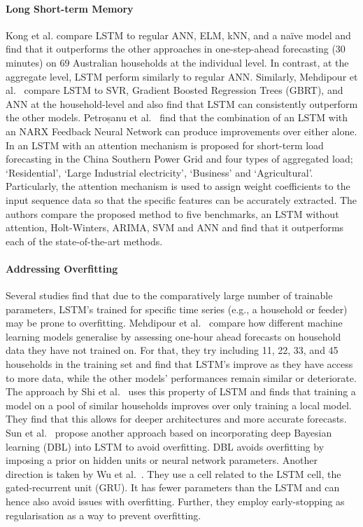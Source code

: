 \paragraph{Long Short-term Memory} Kong et al.\cite{kong2017str} compare LSTM to regular ANN, ELM, kNN, and a na{\"i}ve model and find that it outperforms the other approaches in one-step-ahead forecasting (30 minutes) on 69 Australian households at the individual level. In contrast, at the aggregate level, LSTM perform similarly to regular ANN. Similarly, Mehdipour et al.~\cite{mehdipour2020slf} compare LSTM to SVR, Gradient Boosted Regression Trees (GBRT), and ANN at the household-level and also find that LSTM can consistently outperform the other models. Petroșanu et al.~\cite{petrosanu2019ddv} find that the combination of an LSTM with an NARX Feedback Neural Network can produce improvements over either alone. In \cite{lin2020ecp} an LSTM with an attention mechanism is proposed for short-term load forecasting in the China Southern Power Grid and four types of aggregated load; ‘Residential’, ‘Large Industrial electricity’, ‘Business’ and ‘Agricultural’. Particularly, the attention mechanism is used to assign weight coefficients to the input sequence data so that the specific features can be accurately extracted. The authors compare the proposed method to five benchmarks, an LSTM without attention, Holt-Winters, ARIMA, SVM and ANN and find that it outperforms each of the state-of-the-art methods.

\paragraph{Addressing Overfitting} Several studies find that due to the comparatively large number of trainable parameters, LSTM's trained for specific time series (e.g., a household or feeder) may be prone to overfitting. Mehdipour et al.~\cite{mehdipour2020slf} compare how different machine learning models generalise by assessing one-hour ahead forecasts on household data they have not trained on. For that, they try including 11, 22, 33, and 45 households in the training set and find that LSTM's improve as they have access to more data, while the other models' performances remain similar or deteriorate. The approach by Shi et al.~\cite{Shi2017dlf} uses this property of LSTM and finds that training a model on a pool of similar households improves over only training a local model. They find that this allows for deeper architectures and more accurate forecasts. Sun et al.~\cite{sun2019ubd} propose another approach based on incorporating deep Bayesian learning (DBL) into LSTM to avoid overfitting. DBL avoids overfitting by imposing a prior on hidden units or neural network parameters. Another direction is taken by Wu et al.~\cite{wu2020ast}. They use a cell related to the LSTM cell, the gated-recurrent unit (GRU). It has fewer parameters than the LSTM and can hence also avoid issues with overfitting. Further, they employ early-stopping as regularisation as a way to prevent overfitting.

